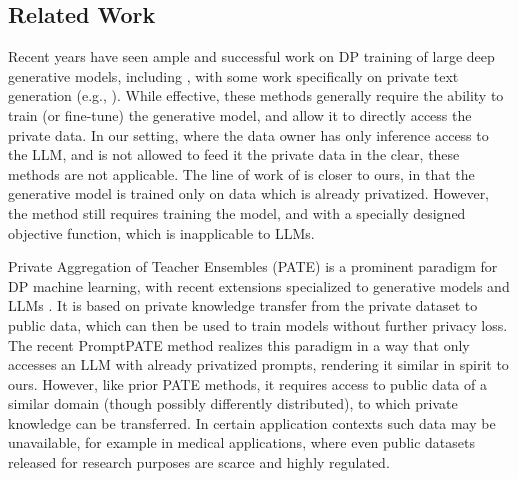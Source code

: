 \subsection{Related Work}\label{sec:related}


Recent years have seen ample and successful work on DP training of large deep generative models, including \cite{xie2018differentially,torkzadehmahani2019dp,chen2020gs,ramaswamy2020training,cao2021don,yu2021differentially,li2021large,zhang2023dpzero,tang2024private}, with some work specifically on private text generation (e.g., \cite{torfi2022differentially,yue2022synthetic,tang2023privacy}).
While effective, these methods generally require the ability to train (or fine-tune) the generative model, and allow it to directly access the private data. In our setting, where the data owner has only inference access to the LLM, and is not allowed to feed it the private data in the clear, these methods are not applicable. The line of work of \cite{harder2021dp,vinaroz2022hermite} is closer to ours, in that the generative model is trained only on data which is already privatized. However, the method still requires training the model, and with a specially designed objective function, which is inapplicable to LLMs. 

Private Aggregation of Teacher Ensembles (PATE) \cite{papernot2016semi,papernot2018scalable} is a prominent paradigm for DP machine learning, with recent extensions specialized to generative models \cite{jordon2018pate} and LLMs 
\cite{duan2023flocks}. It is based on private knowledge transfer from the private dataset to public data, which can then be used to train models without further privacy loss. The recent PromptPATE method \cite{duan2023flocks} realizes this paradigm in a way that only accesses an LLM with already privatized prompts, rendering it similar in spirit to ours. However, like prior PATE methods, it requires access to public data of a similar domain (though possibly differently distributed), to which private knowledge can be transferred.
In certain application contexts such data may be unavailable, for example in medical applications, where even public datasets released for research purposes are scarce and highly regulated. 


